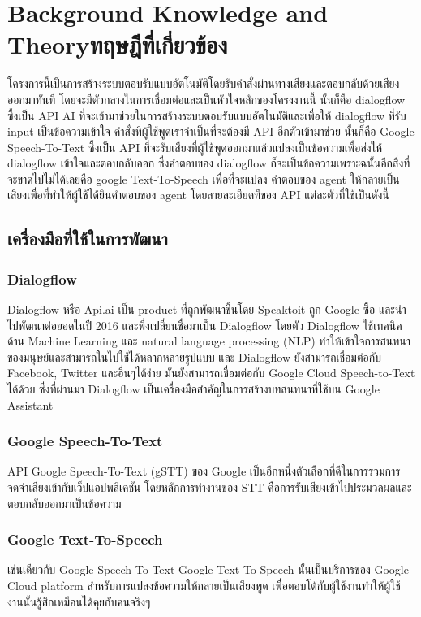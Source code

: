 \chapter{\ifenglish Background Knowledge and Theory\else ทฤษฎีที่เกี่ยวข้อง\fi}

โครงการนี้เป็นการสร้างระบบตอบรับแบบอัตโนมัติโดยรับคำสั่งผ่านทางเสียงและตอบกลับด้วยเสียงออกมาทันที
โดยจะมีตัวกลางในการเชื่อมต่อและเป็นหัวใจหลักของโครงงานนี้ นั้นก็คือ dialogflow ซึ้งเป็น API AI
ที่จะเข้ามาช่วยในการสร้างระบบตอบรับแบบอัตโนมัติและเพื่อให้ dialogflow ที่รับ input เป็นข้อความเข้าใจ
คำสั่งที่ผู้ใช้พูดเราจำเป็นที่จะต้องมี API อีกตัวเข้ามาช่วย นั้นก็คือ Google Speech-To-Text ซึ้งเป็น API
ที่จะรับเสียงที่ผู้ใช้พูดออกมาแล้วแปลงเป็นข้อความเพื่อส่งให้ dialogflow เข้าใจและตอบกลับออก ซึ่งคำตอบของ
dialogflow ก็จะเป็นข้อความเพราะฉนั้นอีกสื่งที่จะขาดไปไม่ได้เลยคือ google Text-To-Speech เพื่อที่จะแปลง
คำตอบของ agent ให้กลายเป็นเสียงเพื่อที่ทำให้ผู้ใช้ได้ยินคำตอบของ agent โดยลายละเอียดทีของ API แต่ละตัวที่ใช้เป็นดังนี้

\section{เครื่องมือที่ใช้ในการพัฒนา}
\subsection{Dialogflow}
Dialogflow หรือ Api.ai เป็น product ที่ถูกพัฒนาขึ้นโดย Speaktoit ถูก Google ซื้อ และนำไปพัฒนาต่อยอดในปี
2016 และพึ่งเปลี่ยนชื่อมาเป็น Dialogflow โดยตัว Dialogflow ใช้เทคนิคด้าน Machine Learning และ natural language
processing (NLP) ทำให้เข้าใจการสนทนาของมนุษย์และสามารถในไปใช้ได้หลากหลายรูปแบบ และ Dialogflow ยังสามารถเชื่อมต่อกับ
Facebook, Twitter และอื่นๆได้ง่าย มันยังสามารถเชื่อมต่อกับ Google Cloud Speech-to-Text ได้ด้วย ซึ่งที่ผ่านมา
Dialogflow เป็นเครื่องมือสำคัญในการสร้างบทสนทนาที่ใช้บน Google Assistant~\cite{df-doc}

\subsection{Google Speech-To-Text}
API Google Speech-To-Text (gSTT) ของ Google เป็นอีกหนึ่งตัวเลือกที่ดีในการรวมการจดจำเสียงเข้ากับเว็ปแอปพลิเคชัน
โดยหลักการทำงานของ STT คือการรับเสียงเข้าไปประมวลผลและตอบกลับออกมาเป็นข้อความ~\cite{gstt-doc}

\subsection{Google Text-To-Speech}
เช่นเดียวกับ Google Speech-To-Text Google Text-To-Speech นั้นเป็นบริการของ Google Cloud platform
สำหรับการแปลงข้อความให้กลายเป็นเสียงพูด เพื่อตอบโต้กับผู้ใช้งานทำให้ผู้ใช้งานนั้นรู้สึกเหมือนได้คุยกับคนจริงๆ~\cite{gtts-doc}

